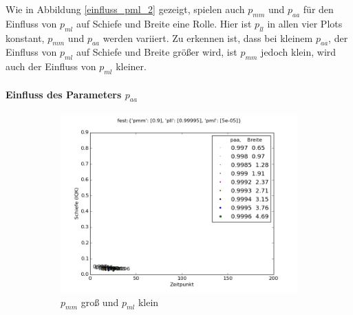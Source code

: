 Wie in Abbildung \ref{einfluss_pml_2} gezeigt, spielen auch $p_{mm}$ und $p_{aa}$ für den Einfluss von $p_{ml}$ auf Schiefe und Breite eine Rolle. Hier ist $p_{ll}$ in allen vier Plots konstant, $p_{mm}$ und $p_{aa}$ werden variiert. Zu erkennen ist, dass bei kleinem $p_{aa}$, der Einfluss von $p_{ml}$ auf Schiefe und Breite größer wird, ist $p_{mm}$ jedoch klein, wird auch der Einfluss von $p_{ml}$ kleiner.


\paragraph*{Einfluss des Parameters $p_{aa}$}

\begin{figure}
\begin{subfigure}[t]{0.5\textwidth}
\includegraphics[width=\textwidth]{bilder/paa/3fest_09_5e-05_p_099995}
\caption{$p_{mm}$ groß und $p_{ml}$ klein}
\end{subfigure}
\begin{subfigure}[t]{0.5\textwidth}

\end{subfigure}
\end{figure}
